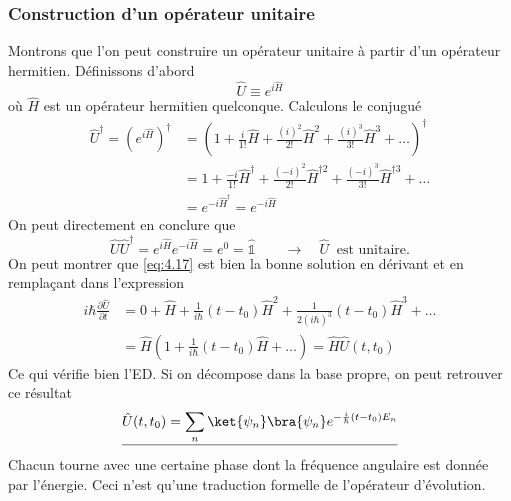 		\subsubsection{Construction d'un opérateur unitaire}
		Montrons que l'on peut construire un opérateur unitaire à partir d'un opérateur hermitien.
		Définissons d'abord
		\begin{equation}
		\hat{U} \equiv e^{i\hat{H}}
		\end{equation}
		où $\hat{H}$ est un opérateur hermitien quelconque. Calculons le conjugué
		\begin{equation}
		\begin{array}{ll}
		\hat{U}^\dagger =\left(e^{i\hat{H}}\right)^\dagger &= \left(1+\frac{i}{1!}	\hat{H}+
		\frac{(i)^2}{2!}\hat{H}^2+\frac{(i)^3}{3!}\hat{H}^3 + \dots\right)^\dagger\\
		&= 1 + \frac{-i}{1!}	\hat{H}^\dagger+\frac{(-i)^2}{2!}\hat{H}^{\dagger2} +\frac{(-i)^3}{3!}\hat{H}^{\dagger3} + \dots\\
		&= e^{-i\hat{H}^\dagger} = e^{-i\hat{H}}
		\end{array}
		\end{equation}
		On peut directement en conclure que
		\begin{equation}
		\hat{U}\hat{U}^\dagger = e^{i\hat{H}}e^{-i\hat{H}} = e^0 = \hat{\mathbb{1}}\qquad \rightarrow\quad
		\hat{U}\ \text{ est unitaire.}
		\end{equation}
		On peut montrer que \autoref{eq:4.17} est bien la bonne solution en dérivant et en 
		remplaçant dans l'expression
		\begin{equation}
		\begin{array}{ll}
		i\hbar\frac{\partial \hat U}{\partial t} &= 0 + \hat{H} + \frac{1}{i\hbar}(t-t_0)
		\hat{H}^2 + \frac{1}{2(i\hbar)^3}(t-t_0)\hat{H}^3+\dots\\
		&= \hat{H}\left(1+\frac{1}{i\hbar}(t-t_0)\hat{H}+\dots\right) = \hat{H}\hat{U}(t, t_0)
		\end{array}
		\end{equation}
		Ce qui vérifie bien l'ED. Si on décompose dans la base propre, on peut retrouver ce résultat
		\begin{equation}
		\underline{\hat{U}(t,t_0) = \sum_n \ket{\psi_n}\bra{\psi_n}e^{-\frac{i}{\hbar}(t-t_0)E_n}}
		\end{equation}
		Chacun tourne avec une certaine phase dont la fréquence angulaire est donnée par l'énergie. Ceci 
		n'est qu'une traduction formelle de l'opérateur d'évolution.\\
		
